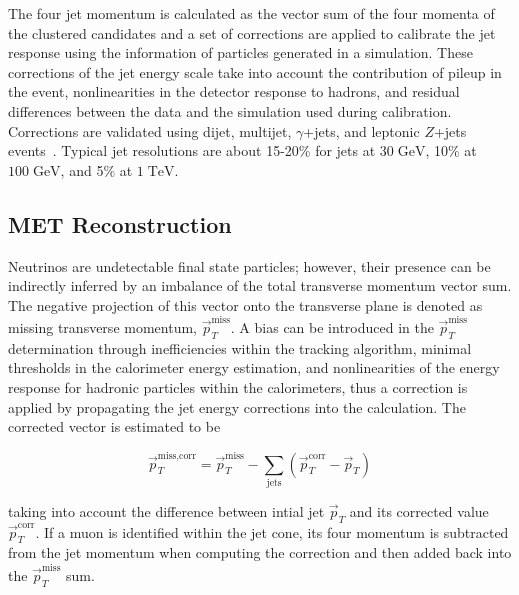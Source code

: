 The four jet momentum is calculated as the vector sum of the four momenta of the clustered candidates and a set of corrections are applied to calibrate the jet response using the information of particles generated in a simulation. These corrections of the jet energy scale take into account the contribution of pileup in the event, nonlinearities in the detector response to hadrons, and residual differences between the data and the simulation used during calibration. Corrections are validated using dijet, multijet, $\gamma$+jets, and leptonic $Z$+jets events~\cite{collaboration_2011,CMS:2016lmd}. Typical jet resolutions are about 15-20\% for jets at $30 \;\text{GeV}$, 10\% at $100\;\text{GeV}$, and 5\% at $1\;\text{TeV}$.



\subsection{MET Reconstruction}
\label{sec:met_reco}

Neutrinos are undetectable final state particles; however, their presence can be indirectly inferred by an imbalance of the total transverse momentum vector sum. The negative projection of this vector onto the transverse plane is denoted as missing transverse momentum, $\vec{p}_T^{\text{miss}}$. A bias can be introduced in the $\vec{p}_T^{\text{miss}}$ determination through inefficiencies within the tracking algorithm, minimal thresholds in the calorimeter energy estimation, and nonlinearities of the energy response for hadronic particles within the calorimeters, thus a correction is applied by propagating the jet energy corrections into the calculation. The corrected vector is estimated to be

\begin{equation}
\vec{p}_T^{\text{miss,corr}} = \vec{p}_T^{\text{miss}} - \sum\limits_\text{jets} \left(\vec{p}_T^{\text{corr}}-\vec{p}_T\right)
\end{equation}

taking into account the difference between intial jet $\vec{p}_T$ and its corrected value $\vec{p}_T^{\text{corr}}$. If a muon is identified within the jet cone, its four momentum is subtracted from the jet momentum when computing the correction and then added back into the $\vec{p}_T^{\text{miss}}$ sum.